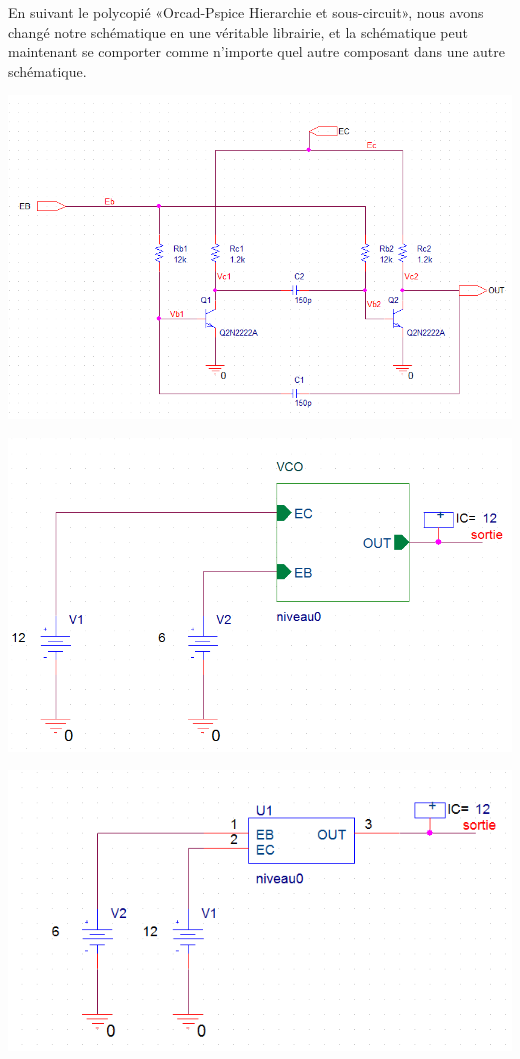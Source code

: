 En suivant le polycopié «Orcad-Pspice Hierarchie et sous-circuit», nous avons changé notre schématique en une véritable librairie, et la schématique peut maintenant se comporter comme n’importe quel autre composant dans une autre schématique.

\includegraphics[width=\linewidth]{../img/schematic_low_hierarchy.png}


\includegraphics[width=\linewidth]{../img/schematic_high_hierarchy.png}


\includegraphics[width=\linewidth]{../img/schematic_vco_final.png}


